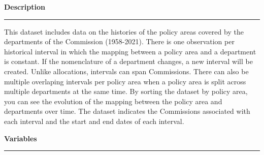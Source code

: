 \documentclass[10pt]{article}
\newcommand{\dividerline}{{\color{gray!10} \rule[4pt] {\textwidth}{3pt}}}
\newcommand{\subheading}[1]{
\vspace{24pt}
{\color{themecolor} \fontsize{14}{14}\selectfont \textbf{#1}}
\vspace{6pt}
\dividerline
\vspace{-20pt}
}
\begin{document}
\begin{flushleft}
\subheading{Description}

This dataset includes data on the histories of the policy areas covered by the departments of the Commission (1958-2021). There is one observation per historical interval in which the mapping between a policy area and a department is constant. If the nomenclature of a department changes, a new interval will be created. Unlike allocations, intervals can span Commissions. There can also be multiple overlaping intervals per policy area when a policy area is split across multiple departments at the same time. By sorting the dataset by policy area, you can see the evolution of the mapping between the policy area and departments over time. The dataset indicates the Commissions associated with each interval and the start and end dates of each interval.

\subheading{Variables}


\end{flushleft}
\end{document}
